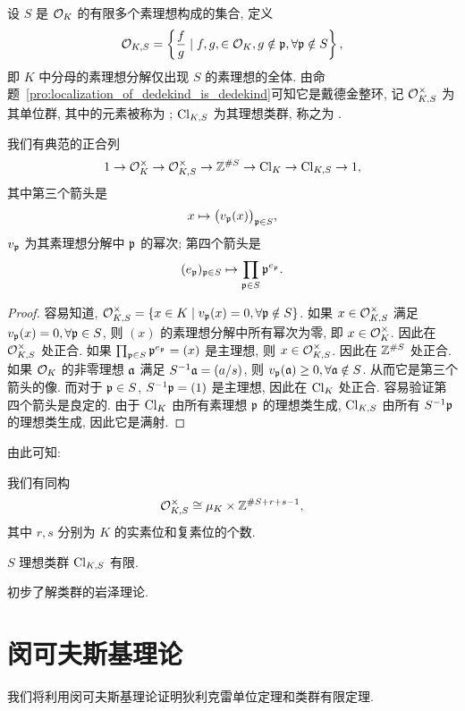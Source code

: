 设 $S$ 是 ${\mathcal{O}}_K$ 的有限多个素理想构成的集合, 定义
	\[{\mathcal{O}}_{K,S}=\left\{\frac{f}{g}\mid f,g,\in{\mathcal{O}}_K,g\notin{\mathfrak{p}},\forall {\mathfrak{p}}\notin S\right\},\]
即 $K$ 中分母的素理想分解仅出现 $S$ 的素理想的全体. 由命题~\ref{pro:localization_of_dedekind_is_dedekind}可知它是戴德金整环, 记 ${\mathcal{O}}_{K,S}^\times$ 为其单位群, 其中的元素被称为 ; ${\mathrm{Cl}}_{K,S}$ 为其理想类群, 称之为 .

\begin{proposition}{}{}
我们有典范的正合列
	\[1\rightarrow{\mathcal{O}}_K^\times\rightarrow{\mathcal{O}}_{K,S}^\times\rightarrow{\mathbb{Z}}^{\#S}\rightarrow{\mathrm{Cl}}_K\rightarrow{\mathrm{Cl}}_{K,S}\rightarrow 1,\]
其中第三个箭头是
	\[x\mapsto \bigl(v_{\mathfrak{p}}(x)\bigr)_{{\mathfrak{p}}\in S},\]
$v_{\mathfrak{p}}$ 为其素理想分解中 ${\mathfrak{p}}$ 的幂次; 第四个箭头是
	\[(e_{\mathfrak{p}})_{{\mathfrak{p}}\in S}\mapsto \prod_{{\mathfrak{p}}\in S}{\mathfrak{p}}^{e_{\mathfrak{p}}}.\]
\end{proposition}
\begin{proof}
容易知道, ${\mathcal{O}}_{K,S}^\times=\left\{x\in K\mid v_{\mathfrak{p}}(x)=0,\forall {\mathfrak{p}}\notin S\right\}$.
如果 $x\in{\mathcal{O}}_{K,S}^\times$ 满足 $v_{\mathfrak{p}}(x)=0,\forall {\mathfrak{p}}\in S$, 则 $(x)$ 的素理想分解中所有幂次为零, 即 $x\in{\mathcal{O}}_K^\times$. 因此在 ${\mathcal{O}}_{K,S}^\times$ 处正合. 
如果 $\prod_{{\mathfrak{p}}\in S}{\mathfrak{p}}^{e_{\mathfrak{p}}}=(x)$ 是主理想, 则 $x\in{\mathcal{O}}_{K,S}^\times$. 因此在 ${\mathbb{Z}}^{\#S}$ 处正合.
如果 ${\mathcal{O}}_K$ 的非零理想 ${\mathfrak{a}}$ 满足 $S^{-1}{\mathfrak{a}}=(a/s)$, 则 $v_{\mathfrak{p}}({\mathfrak{a}})\ge 0,\forall {\mathfrak{a}}\notin S$. 从而它是第三个箭头的像. 而对于 ${\mathfrak{p}}\in S$, $S^{-1}{\mathfrak{p}}=(1)$ 是主理想, 因此在 ${\mathrm{Cl}}_K$ 处正合.
容易验证第四个箭头是良定的. 由于 ${\mathrm{Cl}}_K$ 由所有素理想 ${\mathfrak{p}}$ 的理想类生成, ${\mathrm{Cl}}_{K,S}$ 由所有 $S^{-1}{\mathfrak{p}}$ 的理想类生成, 因此它是满射.
\end{proof}

由此可知:
\begin{corollary}{}{}
我们有同构
	\[{\mathcal{O}}_{K,S}^\times\cong\mu_K\times{\mathbb{Z}}^{\#S+r+s-1},\]
其中 $r,s$ 分别为 $K$ 的实素位和复素位的个数.
\end{corollary}
\begin{corollary}{}{}
$S$ 理想类群 ${\mathrm{Cl}}_{K,S}$ 有限.
\end{corollary}


\begin{exercise}
	初步了解类群的岩泽理论.
\end{exercise}



\section{闵可夫斯基理论}
我们将利用闵可夫斯基理论证明狄利克雷单位定理和类群有限定理.

